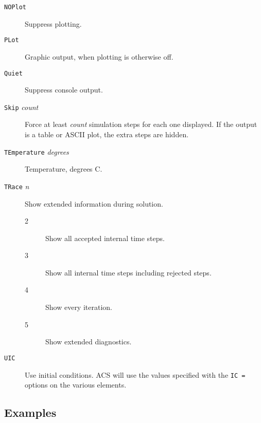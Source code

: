\begin{description}



\item[{\tt NOPlot}] Suppress plotting.

\item[{\tt PLot}] Graphic output, when plotting is otherwise
off.

\item[{\tt Quiet}] Suppress console output.

\item[{\tt Skip} {\it count}] Force at least {\it count} simulation
steps for each one displayed.  If the output is a table or ASCII plot, the
extra steps are hidden.


\item[{\tt TEmperature} {\it degrees}] Temperature, degrees C.

\item[{\tt TRace} {\it n}] Show extended information during solution.
\begin{description}
\item[2] Show all accepted internal time steps.
\item[3] Show all internal time steps including rejected steps.
\item[4] Show every iteration.
\item[5] Show extended diagnostics.
\end{description}

\item[{\tt UIC}] Use initial conditions.  ACS will use the values
specified with the {\tt IC =} options on the various elements.

\end{description}
\subsection{Examples}


